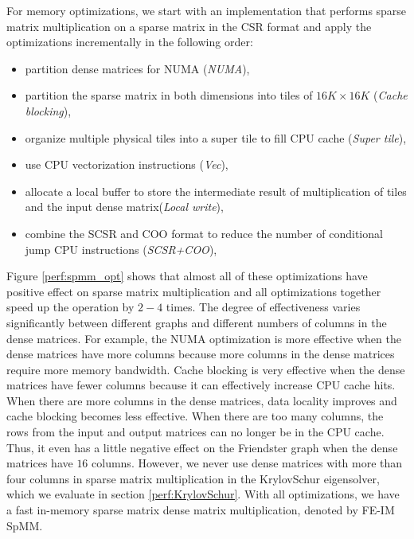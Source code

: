 For memory optimizations, we start with an implementation that performs sparse
matrix multiplication on a sparse matrix in the CSR format and apply
the optimizations incrementally in the following order:
\begin{itemize} \itemsep1pt \parskip0pt 
		\item partition dense matrices for NUMA (\textit{NUMA}),
	\item partition the sparse matrix in both dimensions into tiles of
		$16K \times 16K$ (\textit{Cache blocking}),
	\item organize multiple physical tiles into a super tile to fill CPU cache
		(\textit{Super tile}),
	\item use CPU vectorization instructions (\textit{Vec}),
	\item allocate a local buffer to store the intermediate result of
		multiplication of tiles and the input dense matrix(\textit{Local write}),
	\item combine the SCSR and COO format to reduce the number of conditional
		jump CPU instructions (\textit{SCSR+COO}),
\end{itemize}

Figure \ref{perf:spmm_opt} shows that almost all of these optimizations have
positive effect on sparse matrix multiplication and all optimizations
together speed up the operation by $2-4$ times.
The degree of effectiveness varies
significantly between different graphs and different numbers of columns in
the dense matrices. For example, the NUMA optimization is more effective when
the dense matrices have more columns because more columns in the dense matrices
require more memory bandwidth. Cache blocking is very effective when
the dense matrices have fewer columns because it can effectively increase CPU
cache hits. When there are more columns in the dense matrices, data locality
improves and cache blocking becomes less effective. When there are too many
columns, the rows from
the input and output matrices can no longer be in the CPU cache. Thus, it even
has a little negative effect on the Friendster graph when the dense matrices
have $16$ columns. However, we never use dense matrices with more than four
columns in sparse matrix multiplication in the KrylovSchur eigensolver, which
we evaluate in section \ref{perf:KrylovSchur}. With all optimizations, we
have a fast in-memory sparse matrix dense matrix multiplication, denoted by
FE-IM SpMM.


